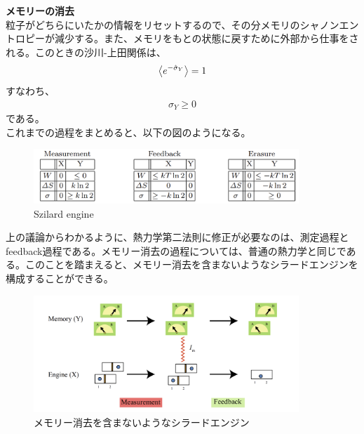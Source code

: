 \documentclass[a4paper,11pt]{jsarticle}
\numberwithin{equation}{section}
\begin{document}
\textbf{メモリーの消去}\\
粒子がどちらにいたかの情報をリセットするので、その分メモリのシャノンエントロピーが減少する。また、メモリをもとの状態に戻すために外部から仕事をされる。このときの沙川-上田関係は、
\begin{align}
    \ev{e^{-\hat{\sigma}_Y}} = 1
\end{align}
すなわち、
\begin{align}
    \sigma_Y \geq 0
\end{align}
である。\\

これまでの過程をまとめると、以下の図のようになる。\\
\begin{figure}[H]
    \begin{center}
    \includegraphics[width=100mm]{mfe.png}
    \end{center}
    \caption{Szilard engine}
    \label{fig:mfe}
\end{figure}
上の議論からわかるように、熱力学第二法則に修正が必要なのは、測定過程とfeedback過程である。メモリー消去の過程については、普通の熱力学と同じである。このことを踏まえると、メモリー消去を含まないようなシラードエンジンを構成することができる。

\begin{figure}[H]
    \begin{center}
    \includegraphics[width=100mm]{s2.png}
    \end{center}
    \caption{メモリー消去を含まないようなシラードエンジン}
    \label{fig:s2}
\end{figure}
\end{document}
